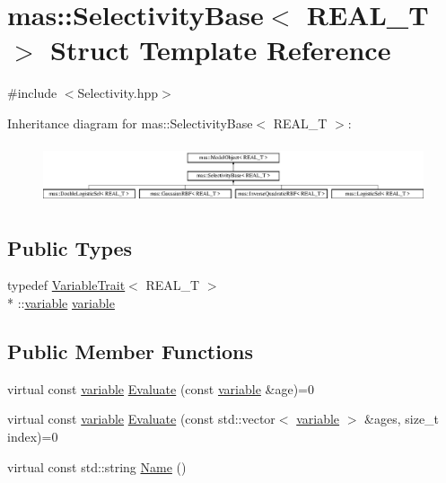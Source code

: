 \hypertarget{structmas_1_1_selectivity_base}{\section{mas\-:\-:Selectivity\-Base$<$ R\-E\-A\-L\-\_\-\-T $>$ Struct Template Reference}
\label{structmas_1_1_selectivity_base}
}


{\ttfamily \#include $<$Selectivity.\-hpp$>$}

Inheritance diagram for mas\-:\-:Selectivity\-Base$<$ R\-E\-A\-L\-\_\-\-T $>$\-:\begin{figure}[H]
\begin{center}
\leavevmode
\includegraphics[height=1.750000cm]{structmas_1_1_selectivity_base}
\end{center}
\end{figure}
\subsection*{Public Types}
\begin{DoxyCompactItemize}
\item 
typedef \hyperlink{structmas_1_1_variable_trait}{Variable\-Trait}$<$ R\-E\-A\-L\-\_\-\-T $>$\\*
\-::\hyperlink{structmas_1_1_model_object_a4e62fdbb5826f8fac311262b888ab10a}{variable} \hyperlink{structmas_1_1_selectivity_base_a72a30a97f46039dc8b2161e4de308fee}{variable}
\end{DoxyCompactItemize}
\subsection*{Public Member Functions}
\begin{DoxyCompactItemize}
\item 
virtual const \hyperlink{structmas_1_1_model_object_a4e62fdbb5826f8fac311262b888ab10a}{variable} \hyperlink{structmas_1_1_selectivity_base_a1c26fb2107d380ac4540271280031bf4}{Evaluate} (const \hyperlink{structmas_1_1_model_object_a4e62fdbb5826f8fac311262b888ab10a}{variable} \&age)=0
\item 
virtual const \hyperlink{structmas_1_1_model_object_a4e62fdbb5826f8fac311262b888ab10a}{variable} \hyperlink{structmas_1_1_selectivity_base_a52058fc9fe373bcc6deebd43bfc3f402}{Evaluate} (const std\-::vector$<$ \hyperlink{structmas_1_1_model_object_a4e62fdbb5826f8fac311262b888ab10a}{variable} $>$ \&ages, size\-\_\-t index)=0
\item 
virtual const std\-::string \hyperlink{structmas_1_1_selectivity_base_ad14deefa4cddcc1c93ef17cc0a3e566a}{Name} ()
\end{DoxyCompactItemize}
